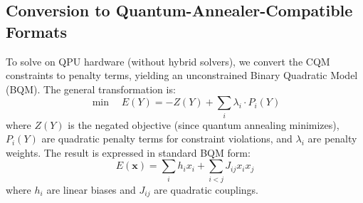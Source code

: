 \documentclass{oqireport}
\begin{document}




\subsection{Conversion to Quantum-Annealer-Compatible Formats}

To solve on QPU hardware (without hybrid solvers), we convert the CQM constraints to penalty terms, yielding an unconstrained Binary Quadratic Model (BQM). The general transformation is:
\begin{equation}
\min \quad E(Y) = -Z(Y) + \sum_{i} \lambda_i \cdot P_i(Y)
\end{equation}
where $Z(Y)$ is the negated objective (since quantum annealing minimizes), $P_i(Y)$ are quadratic penalty terms for constraint violations, and $\lambda_i$ are penalty weights. The result is expressed in standard BQM form:
\begin{equation}
E(\mathbf{x}) = \sum_{i} h_i x_i + \sum_{i<j} J_{ij} x_i x_j
\end{equation}
where $h_i$ are linear biases and $J_{ij}$ are quadratic couplings.
\end{document}
